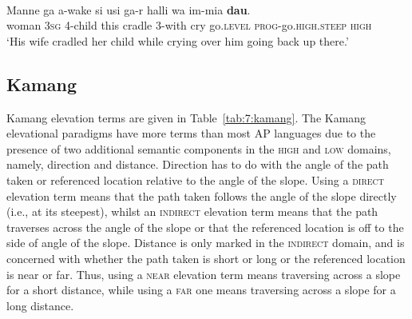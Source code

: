 \ea%
\label{ex:7:37}
 \\
\gll Manne   ga{\ng}  a-wake  si{\ng}  usi{\ng}  ga-r  halli  wa  im-mia  \textbf{dau}. \\
   woman  \textsc{3sg} 4-child  this    cradle  3-with  cry  go.\textsc{level}   \textsc{prog}{}-go.\textsc{high.steep} \textsc {high   } \\
\glt  `His wife cradled her child while crying over him going back up there.'
\z


 

\subsection{Kamang}
Kamang elevation terms are given in Table~\ref{tab:7:kamang}. The Kamang elevational paradigms have more terms than most AP languages due to the presence of two additional semantic components in the \textsc{high} and \textsc{low} domains, namely, direction and distance. Direction has to do with the angle of the path taken or referenced location relative to the angle of the slope. Using a \textsc{direct} elevation term means that the path taken follows the angle of the slope directly (i.e., at its steepest), whilst an \textsc{indirect} elevation term means that the path traverses across the angle of the slope or that the referenced location is off to the side of angle of the slope. Distance is only marked in the \textsc{indirect} domain, and is concerned with whether the path taken is short or long or the referenced location is near or far. Thus, using a \textsc{near} elevation term means traversing across a slope for a short distance, while using a \textsc{far} one means traversing across a slope for a long distance.

 

